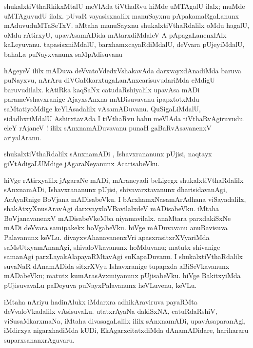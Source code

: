 \documentclass{article}
\begin{document}
\begin{mn}
shukalxtiVthaRkikxMtalU meVlAda tiVthaRvu hiMde uMTAgalU ilalx; muMde uMTAguvudU ilalx. pUvaR 
vayasisxnalilx manuSayxnu pApakamaRgaLanunx mAduvuduMTaSeTxV. aMtaha manuSayxnu 
shukalxtiVthaRdalilx oMdu hagalU, oMdu rAtirxyU, upavAsamADida mAtarxdiMdaleV A pApagaLanenxlAlx
kaLeyuvanu. tapasisxniMdalU, barxhamxcayaRdiMdalU, deVvara pUjeyiMdalU, bahaLa puNayxvanunx 
saMpAdisuvanu
\end{mn}

\begin{mn}
hAgeyeV ililx mADuva deVvatoVdedxVshakavAda darxvayxdAnadiMda baruva puNayxvu, nArAru 
diVGaRkarxtugaLanAnxcarisuvudariMda eMdigU baruvudilalx. kAtiRka kaqSaNx catudaRshiyalilx upavAsa 
mADi parameVshavxranige AjayxsAnxna mADisuvavanu ipapxtotxMdu saMtatiyoMdige keYlAsadalilx 
vAsamADuvanu. QuSigaLiMdalU, sidadhxriMdalU AshirxtavAda I tiVthaRvu bahu meVlAda 
tiVthaRvAgiruvudu. eleY rAjaneV ! ililx sAnxnamADuvavanu punaH gaBaRvAsavanenxV ariyalAranu. 
\end{mn}

\begin{mn}
shukalxtiVthaRdalilx sAnxnamADi , Ishavxrananunx pUjisi, naqtayx giVtAdigaLUMdige 
jAgaraNeyanunx AcarisabeVku.
\end{mn}

\begin{mn}
hiVge rAtirxyalilx jAgaraNe mADi, mAraneyadi beLigegx shukalxtiVthaRdalilx sAnxnamADi, 
Ishavxrananunx pUjisi, shivavarxtavanunx dharisidavanAgi, AcAyaRnige BoVjana mADisabeVku.
I bArxhamxNasamArAdhana viSayadalilx, shakAtxyXnusAravAgi darxvayxloVBavilalxdeV mADisabeVku.
iMtaha BoVjanavanenxV mADisabeVkeMba niyamavilalx. anaMtara parxdakiSxNe mADi deVvara samipakekx 
hoVgabeVku. hiVge mADuvavanu anuBavisuva Palavanunx keVLu. divayxvAhanavanenxVri 
apasxrasitxrXVyariMda saMsUtxyamAnanAgi, shivaloVkavanunx  hoMduvanu; matutx shivanige samanAgi 
parxLayakAlapayaRMtavAgi suKapaDuvanu. I shukalxtiVthaRdalilx suvaNaR dAnamADida sitxrXVyu 
Ishavxranige  tupapxda aBiSeVkavanunx mADabeVku; matutx kumArasAvxmiyanunx pUjisabeVku. hiVge 
BakitxyiMda pUjisuvavaLu paDeyuva puNayxPalavanunx heVLuvenu, keVLu.
\end{mn}

\begin{mn}
iMtaha nAriyu hadinAlukx iMdarxra adhikAraviruva payaRMta deVvaloVkadalilx vAsisuvaLu. utatxrAyaNa 
dakiSxNA, catuRdaRshiV, viSusaMkarxmaNa, iMtaha divasagaLalilx ililx sAnxnamADi, upavAsaparanAgi, 
iMdirxya nigarxhadiMda kUDi, EkAgarxcitatxdiMda dAnamADidare, harihararu suparxsananxrAguvaru.
\end{mn}
\end{document}
